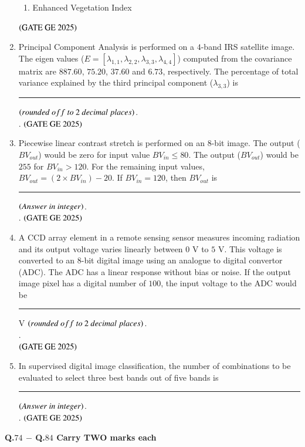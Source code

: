 \documentclass[journal,12pt,onecolumn]{IEEEtran}
\theoremstyle{remark}
\begin{document}
\begin{enumerate}
\begin{enumerate}
\item Enhanced Vegetation Index
\end{enumerate}
\hfill $\left(\text{GATE GE 2025}\right)$
\bigskip
\item Principal Component Analysis is performed on a $4$-band IRS satellite image. The eigen values ($E = [\lambda_{1,1}, \lambda_{2,2}, \lambda_{3,3}, \lambda_{4,4}]$) computed from the covariance matrix are $887.60$, $75.20$, $37.60$ and $6.73$, respectively. The percentage of total variance explained by the third principal component ($\lambda_{3,3}$) is \rule{2cm}{0.5mm} $\brak{rounded\ off\ to\ 2\ decimal\ places}$.\\.
\hfill $\left(\text{GATE GE 2025}\right)$
\bigskip
\item Piecewise linear contrast stretch is performed on an $8$-bit image. The output ($BV_{out}$) would be zero for input value $BV_{in} \le 80$. The output ($BV_{out}$) would be $255$ for $BV_{in} > 120$. For the remaining input values, $BV_{out} = (2 \times BV_{in}) - 20$. If $BV_{in} = 120$, then $BV_{out}$ is \rule{2cm}{0.5mm} $\left(Answer\ in\ integer\right)$.\\.
\hfill $\left(\text{GATE GE 2025}\right)$
\bigskip
\item A CCD array element in a remote sensing sensor measures incoming radiation and its output voltage varies linearly between $0$ V to $5$ V. This voltage is converted to an $8$-bit digital image using an analogue to digital convertor (ADC). The ADC has a linear response without bias or noise. If the output image pixel has a digital number of $100$, the input voltage to the ADC would be \rule{2cm}{0.5mm} V $\brak{rounded\ off\ to\ 2\ decimal\ places}$.\\.\\
\hfill $\left(\text{GATE GE 2025}\right)$
\bigskip
\item In supervised digital image classification, the number of combinations to be evaluated to select three best bands out of five bands is \rule{2cm}{0.5mm} $\left(Answer\ in\ integer\right)$.\\.
\hfill $\left(\text{GATE GE 2025}\right)$
\bigskip
\end{enumerate}
\textbf{Q.$74$ $-$ Q.$84$ Carry TWO marks each}\\
\end{document}

